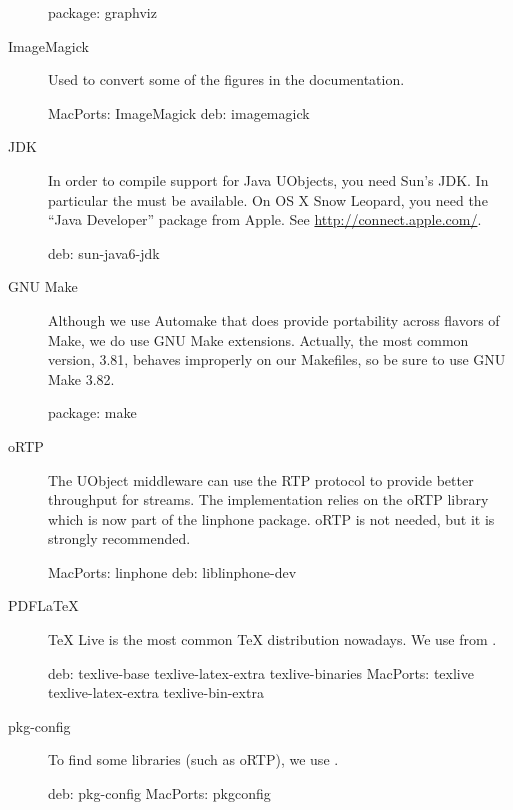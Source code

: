 \begin{description}
\begin{package}
package: graphviz
\end{package}

\item[ImageMagick] Used to convert some of the figures in the
  documentation.
\begin{package}
MacPorts: ImageMagick
deb: imagemagick
\end{package}

\item[JDK] In order to compile support for Java UObjects, you need Sun's
  JDK.  In particular the  must be available.  On OS X Snow
  Leopard, you need the ``Java Developer'' package from Apple.  See
  \url{http://connect.apple.com/}.
\begin{package}
deb: sun-java6-jdk
\end{package}

\item[GNU Make] Although we use Automake that does provide portability
  across flavors of Make, we do use GNU Make extensions.  Actually, the most
  common version, 3.81, behaves improperly on our Makefiles, so be sure to
  use GNU Make 3.82.
\begin{package}
package: make
\end{package}

\item[oRTP] The UObject middleware can use the RTP protocol to provide
  better throughput for streams.  The implementation relies on the oRTP
  library which is now part of the linphone package.  oRTP is not needed,
  but it is strongly recommended.
\begin{package}
MacPorts: linphone
deb: liblinphone-dev
\end{package}

\item[PDFLaTeX] TeX Live is the most common \TeX{} distribution nowadays.
  We use  from .
\begin{package}
deb: texlive-base texlive-latex-extra texlive-binaries
MacPorts: texlive texlive-latex-extra texlive-bin-extra
\end{package}

\item[pkg-config] To find some libraries (such as oRTP), we use
  .
\begin{package}
deb: pkg-config
MacPorts: pkgconfig
\end{package}


\end{description}

